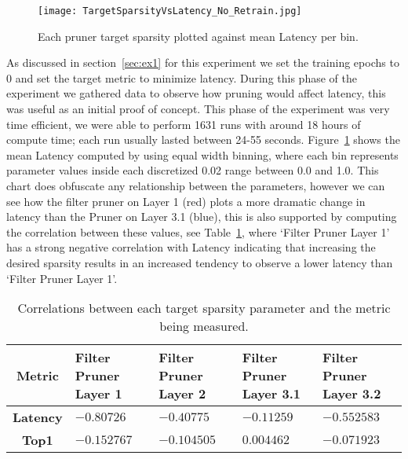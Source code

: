 \documentclass[../Dissertation.tex]{subfiles}
\begin{document}
\begin{figure}[H]
    \texttt{[image: TargetSparsityVsLatency\_No\_Retrain.jpg]}
    \caption{Each pruner target sparsity plotted against mean Latency per bin.}
    \label{fig:fastPruneParamVSLatency}
\end{figure}

As discussed in section~\ref{sec:ex1} for this experiment we set the training epochs to 0 and set the target metric to minimize latency. 
During this phase of the experiment we gathered data to observe how pruning would affect latency, this was useful as an initial proof of concept.
This phase of the experiment was very time efficient, we were able to perform 1631 runs with around 18 hours of compute time; each run usually lasted between 24-55 seconds. 
Figure~\ref{fig:fastPruneParamVSLatency} shows the mean Latency computed by using equal width binning, where each bin represents parameter values inside each discretized 0.02 range between 0.0 and 1.0.
This chart does obfuscate any relationship between the parameters, however we can see how the filter pruner on Layer 1 (red) plots a more dramatic change in latency than the Pruner on Layer 3.1 (blue), this is also supported by computing the correlation between these values, see Table~\ref{tab:fastPruneCorrelations}, where `Filter Pruner Layer 1' has a strong negative correlation with Latency indicating that increasing the desired sparsity results in an increased tendency to observe a lower latency than `Filter Pruner Layer 1'.

\singlespacing
\begin{table}[H]
    \centering
    \begin{tabular}{@{}cp{26mm}p{26mm}p{26mm}p{26mm}@{}}
    \toprule
    \textbf{Metric}  & \textbf{Filter Pruner  Layer 1} & \textbf{Filter Pruner Layer 2} & \textbf{Filter Pruner Layer 3.1} & \textbf{Filter Pruner Layer 3.2} \\ \midrule
    \textbf{Latency} & $-0.80726$                        & $-0.40775$                      & $-0.11259$                         & $-0.552583$                         \\
    \textbf{Top1}    & $-0.152767$                       & $-0.104505$                     & $0.004462$                        & $-0.071923$                     \\ \bottomrule
    \end{tabular}
    \caption{Correlations between each target sparsity parameter and the metric being measured.}
    \label{tab:fastPruneCorrelations}
\end{table}
\doublespacing
\end{document}
